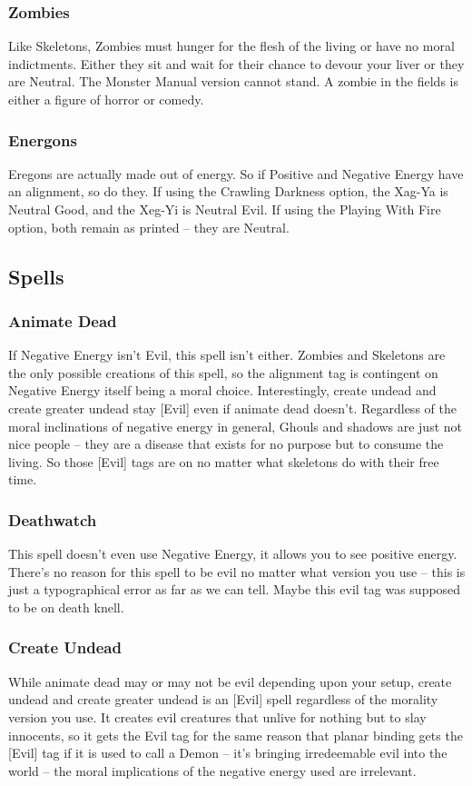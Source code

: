\subsubsection{Zombies} Like Skeletons, Zombies must hunger for the flesh of the living or have no moral indictments. Either they sit and wait for their chance to devour your liver or they are Neutral. The Monster Manual version cannot stand. A zombie in the fields is either a figure of horror or comedy.

\subsubsection{Energons} Eregons are actually made out of energy. So if Positive and Negative Energy have an alignment, so do they. If using the Crawling Darkness option, the Xag-Ya is Neutral Good, and the Xeg-Yi is Neutral Evil. If using the Playing With Fire option, both remain as printed -- they are Neutral.

\subsection{Spells}

\subsubsection{Animate Dead} If Negative Energy isn't Evil, this spell isn't either. Zombies and Skeletons are the only possible creations of this spell, so the alignment tag is contingent on Negative Energy itself being a moral choice. Interestingly, create undead and create greater undead stay [Evil] even if animate dead doesn't. Regardless of the moral inclinations of negative energy in general, Ghouls and shadows are just not nice people -- they are a disease that exists for no purpose but to consume the living. So those [Evil] tags are on no matter what skeletons do with their free time.

\subsubsection{Deathwatch} This spell doesn't even use Negative Energy, it allows you to see positive energy. There's no reason for this spell to be evil no matter what version you use -- this is just a typographical error as far as we can tell. Maybe this evil tag was supposed to be on death knell.

\subsubsection{Create Undead} While animate dead may or may not be evil depending upon your setup, create undead and create greater undead is an [Evil] spell regardless of the morality version you use. It creates evil creatures that unlive for nothing but to slay innocents, so it gets the Evil tag for the same reason that planar binding gets the [Evil] tag if it is used to call a Demon -- it's bringing irredeemable evil into the world -- the moral implications of the negative energy used are irrelevant.
